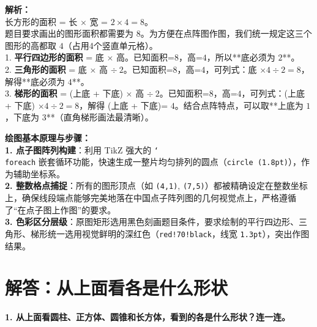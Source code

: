 \documentclass[12pt, a4paper]{ctexrep}
\begin{document}
\vspace{0.8cm}

{\small\color{gray}
\textbf{解析：}\\
长方形的面积 = 长 $\times$ 宽 = $2 \times 4 = 8$。\\
题目要求画出的图形面积都需要为 $8$。为方便在点阵图作图，我们统一规定这三个图形的高都取 $4$（占用4个竖直单元格）。\\
1. \textbf{平行四边形的面积} = 底 $\times$ 高。已知面积=$8$，高=$4$，所以**底必须为 $2$**。\\
2. \textbf{三角形的面积} = 底 $\times$ 高 $\div\ 2$。已知面积=$8$，高=$4$，可列式：底 $\times 4 \div 2 = 8$，解得**底必须为 $4$**。\\
3. \textbf{梯形的面积} = (上底 + 下底) $\times$ 高 $\div\ 2$。已知面积=$8$，高=$4$，可列式：(上底 + 下底) $\times 4 \div 2 = 8$，解得 (上底 + 下底)= $4$。结合点阵特点，可以取**上底为 $1$，下底为 $3$**（直角梯形画法最清晰）。
}

\vspace{0.6cm}

{\small\color{blue!70!black}
\textbf{绘图基本原理与步骤：}\\
\textbf{1. 点子图阵列构建}：利用 TikZ 强大的 \texttt{\char`\\foreach} 嵌套循环功能，快速生成一整片均匀排列的圆点（\texttt{circle (1.8pt)}），作为辅助坐标系。\\
\textbf{2. 整数格点捕捉}：所有的图形顶点（如 \texttt{(4,1)}, \texttt{(7,5)}）都被精确设定在整数坐标上，确保线段端点能够完美地落在中国点子阵列图的几何视觉点上，严格遵循了“在点子图上作图”的要求。\\
\textbf{3. 色彩区分层级}：原图矩形选用黑色刻画题目条件，要求绘制的平行四边形、三角形、梯形统一选用视觉鲜明的深红色（\texttt{red!70!black}，线宽 \texttt{1.3pt}），突出作图结果。
}

\newpage

\section{解答：从上面看各是什么形状}

\vspace{0.4cm}

\noindent\textbf{1. 从上面看圆柱、正方体、圆锥和长方体，看到的各是什么形状？连一连。}

\vspace{1.2cm}
\end{document}
